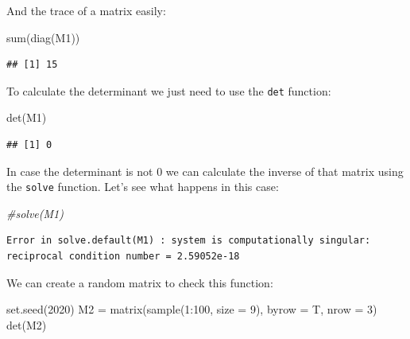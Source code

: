 \documentclass[
]{book}
\newenvironment{Shaded}{\begin{snugshade}}{\end{snugshade}}
\newcommand{\AttributeTok}[1]{\textcolor[rgb]{0.77,0.63,0.00}{#1}}
\newcommand{\CommentTok}[1]{\textcolor[rgb]{0.56,0.35,0.01}{\textit{#1}}}
\newcommand{\DecValTok}[1]{\textcolor[rgb]{0.00,0.00,0.81}{#1}}
\newcommand{\FunctionTok}[1]{\textcolor[rgb]{0.00,0.00,0.00}{#1}}
\newcommand{\NormalTok}[1]{#1}
\newcommand{\OtherTok}[1]{\textcolor[rgb]{0.56,0.35,0.01}{#1}}
\newcommand{\SpecialCharTok}[1]{\textcolor[rgb]{0.00,0.00,0.00}{#1}}
\begin{document}
And the trace of a matrix easily:

\begin{Shaded}
\begin{Highlighting}[]
\FunctionTok{sum}\NormalTok{(}\FunctionTok{diag}\NormalTok{(M1))}
\end{Highlighting}
\end{Shaded}

\begin{verbatim}
## [1] 15
\end{verbatim}

To calculate the determinant we just need to use the \texttt{det} function:

\begin{Shaded}
\begin{Highlighting}[]
\FunctionTok{det}\NormalTok{(M1)}
\end{Highlighting}
\end{Shaded}

\begin{verbatim}
## [1] 0
\end{verbatim}

In case the determinant is not 0 we can calculate the inverse of that matrix using the \texttt{solve} function. Let's see what happens in this case:

\begin{Shaded}
\begin{Highlighting}[]
\CommentTok{\#solve(M1)}
\end{Highlighting}
\end{Shaded}

\begin{verbatim}
Error in solve.default(M1) : system is computationally singular: reciprocal condition number = 2.59052e-18
\end{verbatim}

We can create a random matrix to check this function:

\begin{Shaded}
\begin{Highlighting}[]
\FunctionTok{set.seed}\NormalTok{(}\DecValTok{2020}\NormalTok{)}
\NormalTok{M2 }\OtherTok{=} \FunctionTok{matrix}\NormalTok{(}\FunctionTok{sample}\NormalTok{(}\DecValTok{1}\SpecialCharTok{:}\DecValTok{100}\NormalTok{, }\AttributeTok{size =} \DecValTok{9}\NormalTok{), }\AttributeTok{byrow =}\NormalTok{ T, }\AttributeTok{nrow =} \DecValTok{3}\NormalTok{)}
\FunctionTok{det}\NormalTok{(M2)}
\end{Highlighting}
\end{Shaded}
\end{document}
